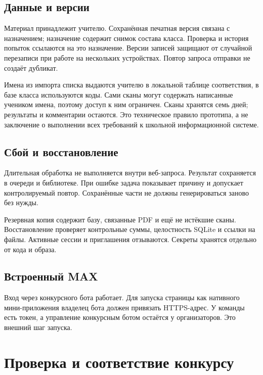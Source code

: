 \documentclass[a4paper,11pt]{article}
\begin{document}
\subsection{Данные и версии}
Материал принадлежит учителю. Сохранённая печатная версия связана с назначением;
назначение содержит снимок состава класса. Проверка и история попыток ссылаются
на это назначение. Версии записей защищают от случайной перезаписи при работе
на нескольких устройствах. Повтор запроса отправки не создаёт дубликат.

Имена из импорта списка выдаются учителю в локальной таблице соответствия,
в базе класса используются коды. Сами сканы могут содержать написанные учеником
имена, поэтому доступ к ним ограничен. Сканы хранятся семь дней; результаты
и комментарии остаются. Это техническое правило прототипа, а не заключение
о выполнении всех требований к школьной информационной системе.

\subsection{Сбой и восстановление}
Длительная обработка не выполняется внутри веб-запроса. Результат сохраняется
в очереди и библиотеке. При ошибке задача показывает причину и допускает
контролируемый повтор. Сохранённые части не должны генерироваться заново без нужды.

Резервная копия содержит базу, связанные PDF и ещё не истёкшие сканы.
Восстановление проверяет контрольные суммы, целостность SQLite и ссылки на файлы.
Активные сессии и приглашения отзываются. Секреты хранятся отдельно от кода и образа.

\subsection{Встроенный MAX}
Вход через конкурсного бота работает. Для запуска страницы как нативного
мини-приложения владелец бота должен привязать HTTPS-адрес. У команды есть токен,
а управление конкурсным ботом остаётся у организаторов. Это внешний шаг запуска.
\newpage
\section{Проверка и соответствие конкурсу}
\end{document}
